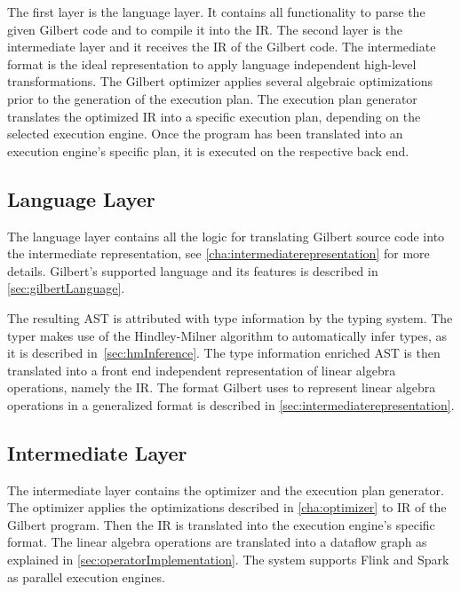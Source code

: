 The first layer is the language layer.
It contains all functionality to parse the given Gilbert code and to compile it into the IR.
The second layer is the intermediate layer and it receives the IR of the Gilbert code.
The intermediate format is the ideal representation to apply language independent high-level transformations.
The Gilbert optimizer applies several algebraic optimizations prior to the generation of the execution plan.
The execution plan generator translates the optimized IR into a specific execution plan, depending on the selected execution engine.
Once the program has been translated into an execution engine's specific plan, it is executed on the respective back end.

\subsection{Language Layer}

The language layer contains all the logic for translating Gilbert source code into the intermediate representation, see \cref{cha:intermediaterepresentation} for more details.
Gilbert's supported language and its features is described in \cref{sec:gilbertLanguage}.

The resulting AST is attributed with type information by the typing system.
The typer makes use of the Hindley-Milner algorithm to automatically infer types, as it is described in~\cref{sec:hmInference}.
The type information enriched AST is then translated into a front end independent representation of linear algebra operations, namely the IR.
The format Gilbert uses to represent linear algebra operations in a generalized format is described in \cref{sec:intermediaterepresentation}.

\subsection{Intermediate Layer}

The intermediate layer contains the optimizer and the execution plan generator.
The optimizer applies the optimizations described in \cref{cha:optimizer} to IR of the Gilbert program.
Then the IR is translated into the execution engine's specific format.
The linear algebra operations are translated into a dataflow graph as explained in \cref{sec:operatorImplementation}.
The system supports Flink and Spark as parallel execution engines.